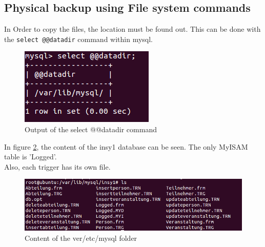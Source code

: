 \documentclass[10pt]{article}
\begin{document}
\subsection{Physical backup using File system commands}
\label{sec:cpmysql}
In Order to copy the files, the location must be found out. This can be done with the \texttt{select @@datadir} command within mysql.
\begin{figure}[!h]
	\begin{center}
		\includegraphics[width=0.4\linewidth]{pictures/datadir_mysql}
		\caption{Output of the select @@datadir command}
		\label{differenceent}
	\end{center}
\end{figure}
\FloatBarrier
In figure \ref{content}, the content of the insy1 database can be seen. The only MyISAM table is 'Logged'.\\
Also, each trigger has its own file.
\FloatBarrier
\begin{figure}[!h]
	\begin{center}
		\includegraphics[width=0.8\linewidth]{pictures/ls_mysql_insy1}
		\caption{Content of the ver/etc/mysql folder}
		\label{content}
	\end{center}
\end{figure}
\FloatBarrier
\end{document}
